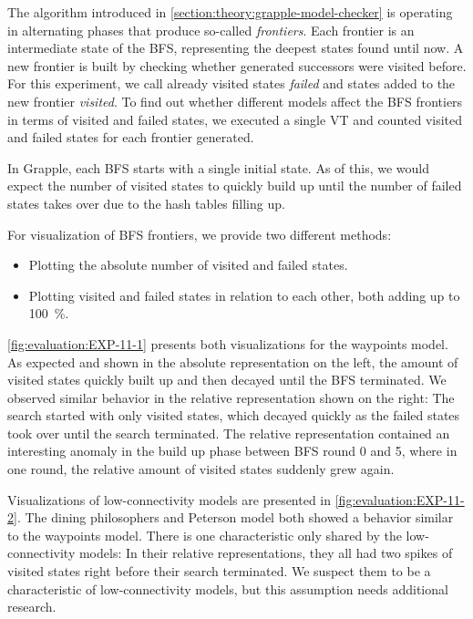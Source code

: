 \documentclass[
fancyheadings, %
%
%
]{stsreprt}
\begin{document}
The algorithm introduced in \cref{section:theory:grapple-model-checker} is operating in alternating phases that produce so-called \emph{frontiers}.
Each frontier is an intermediate state of the BFS, representing the deepest states found until now.
A new frontier is built by checking whether generated successors were visited before.
For this experiment, we call already visited states \emph{failed} and states added to the new frontier \emph{visited}.
To find out whether different models affect the BFS frontiers in terms of visited and failed states, we executed a single VT and counted visited and failed states for each frontier generated.

In Grapple, each BFS starts with a single initial state.
As of this, we would expect the number of visited states to quickly build up until the number of failed states takes over due to the hash tables filling up.

\begin{samepage}
    For visualization of BFS frontiers, we provide two different methods:

    \begin{itemize}
        \item Plotting the absolute number of visited and failed states.
        \item Plotting visited and failed states in relation to each other, both adding up to \SI{100}{\percent}.
    \end{itemize}
\end{samepage}

\cref{fig:evaluation:EXP-11-1} presents both visualizations for the waypoints model.
As expected and shown in the absolute representation on the left, the amount of visited states quickly built up and then decayed until the BFS terminated.
We observed similar behavior in the relative representation shown on the right:
The search started with only visited states, which decayed quickly as the failed states took over until the search terminated.
The relative representation contained an interesting anomaly in the build up phase between BFS round 0 and 5, where in one round, the relative amount of visited states suddenly grew again.

Visualizations of low-connectivity models are presented in \cref{fig:evaluation:EXP-11-2}.
The dining philosophers and Peterson model both showed a behavior similar to the waypoints model.
There is one characteristic only shared by the low-connectivity models:
In their relative representations, they all had two spikes of visited states right before their search terminated.
We suspect them to be a characteristic of low-connectivity models, but this assumption needs additional research.
\end{document}
